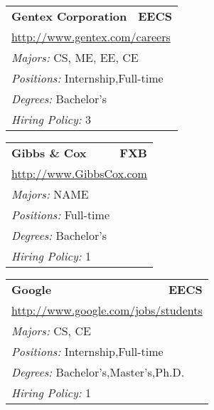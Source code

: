 \documentclass[twoside]{article}
\begin{document}
\begin{center}
\begin{multicols}{3}
\begin{FlushLeft}
\begin{minipage}{.9\columnwidth}
\end{minipage}
 
\begin{minipage}{.9\columnwidth}\begin{tabularx}{.95\columnwidth}{Xr}
                 {\Large\bf Gentex Corporation} & {\Large\bf EECS}\\
    \multicolumn{2}{p{.95\columnwidth}}{\url{http://www.gentex.com/careers}}\\
    \multicolumn{2}{p{.95\columnwidth}}{\emph{Majors:} CS, ME, EE, CE}\\
    \multicolumn{2}{p{.95\columnwidth}}{\emph{Positions:} Internship,Full-time}\\
    \multicolumn{2}{p{.95\columnwidth}}{\emph{Degrees:} Bachelor's}\\
    \multicolumn{2}{p{.95\columnwidth}}{\emph{Hiring Policy:} 3}\\
    \end{tabularx}
    
\end{minipage}
 
\begin{minipage}{.9\columnwidth}\begin{tabularx}{.95\columnwidth}{Xr}
                 {\Large\bf Gibbs \& Cox} & {\Large\bf FXB}\\
    \multicolumn{2}{p{.95\columnwidth}}{\url{http://www.GibbsCox.com}}\\
    \multicolumn{2}{p{.95\columnwidth}}{\emph{Majors:} NAME}\\
    \multicolumn{2}{p{.95\columnwidth}}{\emph{Positions:} Full-time}\\
    \multicolumn{2}{p{.95\columnwidth}}{\emph{Degrees:} Bachelor's}\\
    \multicolumn{2}{p{.95\columnwidth}}{\emph{Hiring Policy:} 1}\\
    \end{tabularx}
    
\end{minipage}
 
\begin{minipage}{.9\columnwidth}\begin{tabularx}{.95\columnwidth}{Xr}
                 {\Large\bf Google} & {\Large\bf EECS}\\
    \multicolumn{2}{p{.95\columnwidth}}{\url{http://www.google.com/jobs/students}}\\
    \multicolumn{2}{p{.95\columnwidth}}{\emph{Majors:} CS, CE}\\
    \multicolumn{2}{p{.95\columnwidth}}{\emph{Positions:} Internship,Full-time}\\
    \multicolumn{2}{p{.95\columnwidth}}{\emph{Degrees:} Bachelor's,Master's,Ph.D.}\\
    \multicolumn{2}{p{.95\columnwidth}}{\emph{Hiring Policy:} 1}\\
    \end{tabularx}
    

\end{minipage}
\end{FlushLeft}
\end{multicols}
\end{center}
\end{document}
